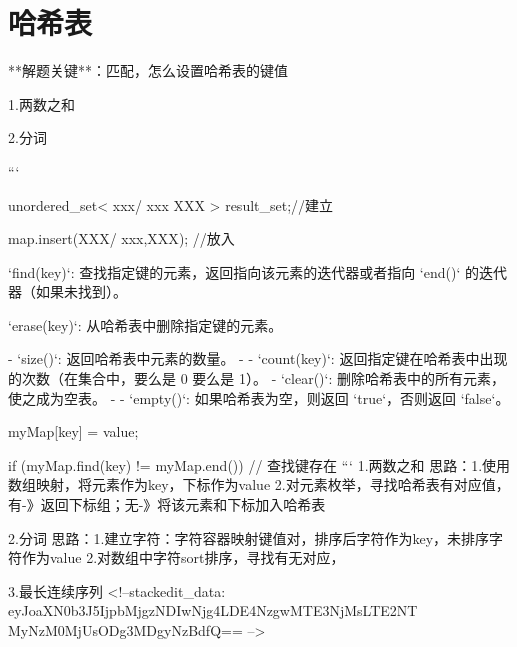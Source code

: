 \chapter{哈希表}

**解题关键**：匹配，怎么设置哈希表的键值


1.两数之和

2.分词

```

unordered_set< xxx/ xxx XXX > result_set;//建立

map.insert(XXX/ {xxx,XXX}); //放入

`find(key)`: 查找指定键的元素，返回指向该元素的迭代器或者指向 `end()` 的迭代器（如果未找到）。

`erase(key)`: 从哈希表中删除指定键的元素。

-   `size()`: 返回哈希表中元素的数量。
- -   `count(key)`: 返回指定键在哈希表中出现的次数（在集合中，要么是 0 要么是 1）。
-   `clear()`: 删除哈希表中的所有元素，使之成为空表。
- -   `empty()`: 如果哈希表为空，则返回 `true`，否则返回 `false`。

myMap[key] = value;

if (myMap.find(key) != myMap.end()) {
    // 查找键存在
}
```
1.两数之和
思路：1.使用数组映射，将元素作为key，下标作为value
2.对元素枚举，寻找哈希表有对应值，有-》返回下标组；无-》将该元素和下标加入哈希表

2.分词
思路：1.建立字符：字符容器映射键值对，排序后字符作为key，未排序字符作为value
2.对数组中字符sort排序，寻找有无对应，

3.最长连续序列
<!--stackedit_data:
eyJoaXN0b3J5IjpbMjgzNDIwNjg4LDE4NzgwMTE3NjMsLTE2NT
MyNzM0MjUsODg3MDgyNzBdfQ==
-->